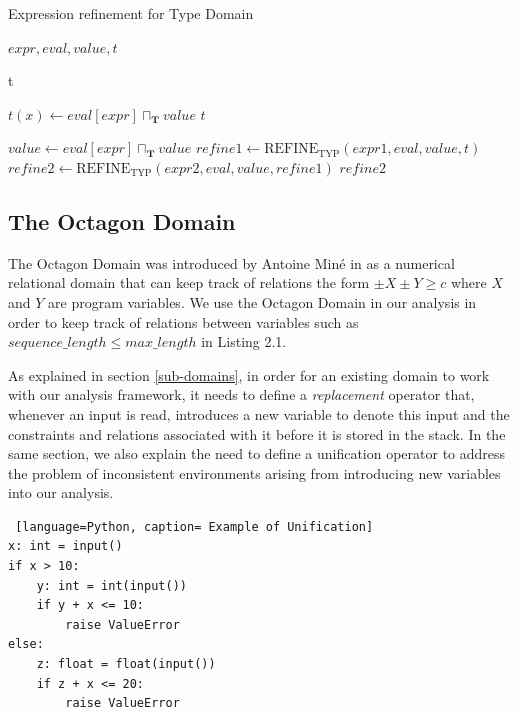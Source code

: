 \documentclass[10pt]{report}
\begin{document}
\begin{algorithm}[H]
	\caption{Expression refinement for Type Domain} \label{refineT}
	\begin{algorithmic}
		 {$ expr, eval, value, t$}
		
		\State \Return t
		\EndIf
		
		\State $ t(x) \gets eval[expr] \sqcap_{\mathbf{T}} value$
		\State \Return $ t $
		\EndIf
		
		\State $ value \gets eval[expr] \sqcap_{\mathbf{T}} value  $
		\State $ refine1 \gets \mathrm{REFINE}_{\mathrm{TYP}}(expr1, eval, value, t) $
		\State $ refine2 \gets \mathrm{REFINE}_{\mathrm{TYP}}(expr2, eval, value, refine1) $
		\State \Return $ refine2 $
		\EndIf
		
		\EndFunction
	\end{algorithmic}
\end{algorithm}

\subsection{The Octagon Domain} \label{octagon}

The Octagon Domain was introduced by Antoine Min\'{e} in \cite{octagon} as a numerical relational domain that can keep track of relations the form $ \pm X \pm Y \geq c $ where $ X $ and $ Y $ are program variables. We use the Octagon Domain in our analysis in order to keep track of relations between variables such as $ sequence\_length \leq max\_length $ in Listing 2.1. 

As explained in section \ref{sub-domains}, in order for an existing domain to work with our analysis framework, it needs to define a \textit{replacement} operator that, whenever an input is read, introduces a new variable to denote this input and the constraints and relations associated with it before it is stored in the stack. In the same section, we also explain the need to define a unification operator to address the problem of inconsistent environments arising from introducing new variables into our analysis. 

 \begin{lstlisting} [language=Python, caption= Example of Unification] 
x: int = input()
if x > 10:
	y: int = int(input())
	if y + x <= 10:
		raise ValueError
else:
	z: float = float(input())
	if z + x <= 20:
		raise ValueError
\end{lstlisting}
\end{document}
